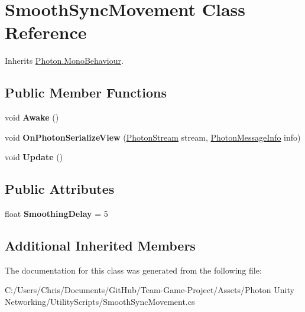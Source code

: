\hypertarget{class_smooth_sync_movement}{}\section{Smooth\+Sync\+Movement Class Reference}
\label{class_smooth_sync_movement}


Inherits \hyperlink{class_photon_1_1_mono_behaviour}{Photon.\+Mono\+Behaviour}.

\subsection*{Public Member Functions}
\begin{DoxyCompactItemize}
\item 
void {\bfseries Awake} ()\hypertarget{class_smooth_sync_movement_a1570a4909f45a3070c9a07a4b38651ba}{}\label{class_smooth_sync_movement_a1570a4909f45a3070c9a07a4b38651ba}

\item 
void {\bfseries On\+Photon\+Serialize\+View} (\hyperlink{class_photon_stream}{Photon\+Stream} stream, \hyperlink{class_photon_message_info}{Photon\+Message\+Info} info)\hypertarget{class_smooth_sync_movement_add0f2ea4291a8c860fe0805938cbb357}{}\label{class_smooth_sync_movement_add0f2ea4291a8c860fe0805938cbb357}

\item 
void {\bfseries Update} ()\hypertarget{class_smooth_sync_movement_a28036023e2b4a53198bd908d77ad7350}{}\label{class_smooth_sync_movement_a28036023e2b4a53198bd908d77ad7350}

\end{DoxyCompactItemize}
\subsection*{Public Attributes}
\begin{DoxyCompactItemize}
\item 
float {\bfseries Smoothing\+Delay} = 5\hypertarget{class_smooth_sync_movement_ac60aea53989eca0129405cf300431f9d}{}\label{class_smooth_sync_movement_ac60aea53989eca0129405cf300431f9d}

\end{DoxyCompactItemize}
\subsection*{Additional Inherited Members}


The documentation for this class was generated from the following file\+:\begin{DoxyCompactItemize}
\item 
C\+:/\+Users/\+Chris/\+Documents/\+Git\+Hub/\+Team-\/\+Game-\/\+Project/\+Assets/\+Photon Unity Networking/\+Utility\+Scripts/Smooth\+Sync\+Movement.\+cs\end{DoxyCompactItemize}
